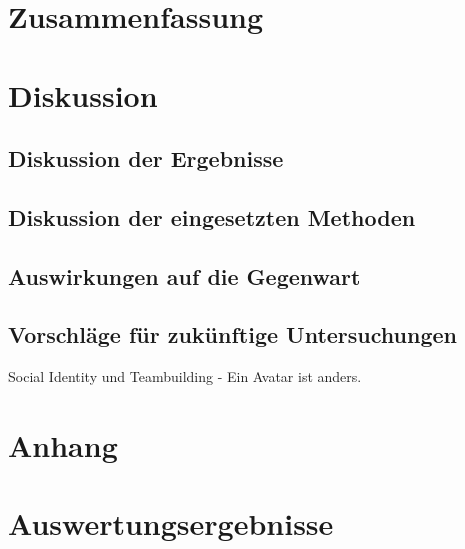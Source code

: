 \documentclass[a4paper,11pt]{article}%
\renewcommand{\\}{\vspace*{0.5\baselineskip} \newline}
\begin{document}
\clearpage
	\newpage
	\section{Zusammenfassung}
	\newpage
	\section{Diskussion}
		\subsection{Diskussion der Ergebnisse}
		\subsection{Diskussion der eingesetzten Methoden}
		\subsection{Auswirkungen auf die Gegenwart}
		\subsection{Vorschläge für zukünftige Untersuchungen}
		Social Identity und Teambuilding - Ein Avatar ist anders.
	
	\newpage
	\appendix	
	\section*{Anhang}

	\section{Auswertungsergebnisse}
\end{document}
